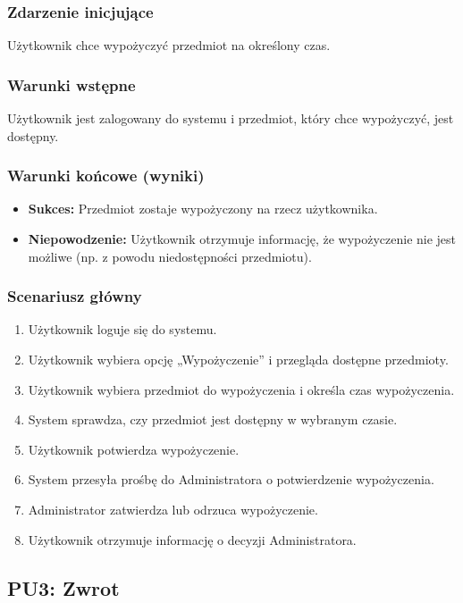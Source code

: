 \documentclass{article}
\begin{document}
\subsubsection{Zdarzenie inicjujące}
Użytkownik chce wypożyczyć przedmiot na określony czas.

\subsubsection{Warunki wstępne}
Użytkownik jest zalogowany do systemu i przedmiot, który chce wypożyczyć, jest dostępny.

\subsubsection{Warunki końcowe (wyniki)}
\begin{itemize}
    \item \textbf{Sukces:} Przedmiot zostaje wypożyczony na rzecz użytkownika.
    \item \textbf{Niepowodzenie:} Użytkownik otrzymuje informację, że wypożyczenie nie jest możliwe (np. z powodu niedostępności przedmiotu).
\end{itemize}

\subsubsection{Scenariusz główny}
\begin{enumerate}
    \item Użytkownik loguje się do systemu.
    \item Użytkownik wybiera opcję „Wypożyczenie” i przegląda dostępne przedmioty.
    \item Użytkownik wybiera przedmiot do wypożyczenia i określa czas wypożyczenia.
    \item System sprawdza, czy przedmiot jest dostępny w wybranym czasie.
    \item Użytkownik potwierdza wypożyczenie.
    \item System przesyła prośbę do Administratora o potwierdzenie wypożyczenia.
    \item Administrator zatwierdza lub odrzuca wypożyczenie.
    \item Użytkownik otrzymuje informację o decyzji Administratora.
\end{enumerate}

\subsection{PU3: Zwrot}
\end{document}
